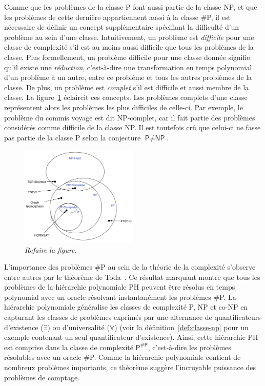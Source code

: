 
Comme que les problèmes de la classe \textsf{P} font aussi partie de la classe \textsf{NP}, et que les problèmes de cette dernière appartiennent aussi à la classe \textsf{\#P}, il est nécessaire de définir un concept supplémentaire spécifiant la difficulté d'un problème au sein d'une classe. Intuitivement, un problème est \textit{difficile} pour une classe de complexité s'il est au moins aussi difficile que tous les problèmes de la classe. Plus formellement, un problème difficile pour une classe donnée signifie qu'il existe une \textit{réduction}, c'est-à-dire une transformation en temps polynomial d'un problème à un autre, entre ce problème et tous les autres problèmes de la classe. De plus, un problème est \textit{complet} s'il est difficile et aussi membre de la classe. La figure~\ref{fig:complexity-classes} éclaircit ces concepts. Les problèmes complets d'une classe représentent alors les problèmes les plus difficiles de celle-ci. Par exemple, le problème du commis voyage est dit \textsf{NP}-complet, car il fait partie des problèmes considérés comme difficile de la classe \textsf{NP}. Il est toutefois crû que celui-ci ne fasse pas partie de la classe \textsf{P} selon la conjecture $\textsf{P} \neq \textsf{NP}$.

\begin{figure}[h!]
    \centering
    \includegraphics[width=0.5\textwidth]{figures/complexity-classes.jpg}
    \caption[Classes de complexité]{\textcolor{mydarkred}{\textit{Refaire la figure.}}}
    \label{fig:complexity-classes}
\end{figure}

L'importance des problèmes \textsf{\#P} au sein de la théorie de la complexité s'observe entre autres par le théorème de Toda~\cite{todaPPHardPolynomialTime1991}. Ce résultat marquant montre que tous les problèmes de la hiérarchie polynomiale \textsf{PH} peuvent être résolus en temps polynomial avec un oracle résolvant instantanément les problèmes \textsf{\#P}. La hiérarchie polynomiale généralise les classes de complexité \textsf{P}, \textsf{NP} et \textsf{co-NP} en capturant les classes de problèmes exprimés par une alternance de quantificateurs d'existence ($\exists$) ou d'universalité ($\forall$) (voir la définition~\ref{def:classe-np} pour un exemple contenant un seul quantificateur d'existence). Ainsi, cette hiérarchie \textsf{PH} est comprise dans la classe de complexité $\textsf{P}^{\textsf{\#P}}$, c'est-à-dire les problèmes résolubles avec un oracle \textsf{\#P}. Comme la hiérarchie polynomiale contient de nombreux problèmes importants, ce théorème suggère l'incroyable puissance des problèmes de comptage.

